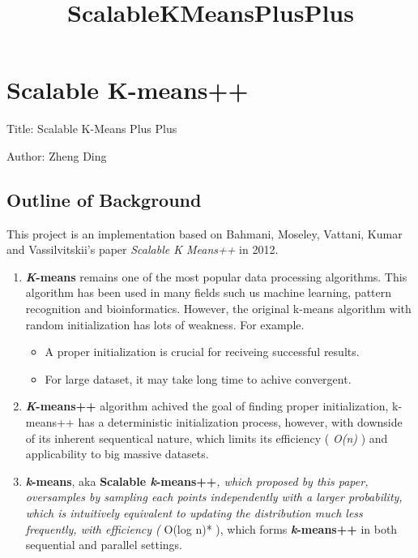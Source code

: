 \documentclass{article}
\title{ScalableKMeansPlusPlus}
\begin{document}
    
    
    \maketitle
    
    

    
    \section{Scalable K-means++}\label{scalable-k-means}

    Title: Scalable K-Means Plus Plus

Author: Zheng Ding

    \subsection{Outline of Background}\label{outline-of-background}

    This project is an implementation based on Bahmani, Moseley, Vattani,
Kumar and Vassilvitskii's paper \emph{Scalable K Means++} in 2012.

\begin{enumerate}
\def\labelenumi{\arabic{enumi}.}
\item
  \textbf{\emph{K}-means} remains one of the most popular data
  processing algorithms. This algorithm has been used in many fields
  such us machine learning, pattern recognition and bioinformatics.
  However, the original k-means algorithm with random initialization has
  lots of weakness. For example.

  \begin{itemize}
  \itemsep1pt\parskip0pt
  \item
    A proper initialization is crucial for reciveing successful results.
  \item
    For large dataset, it may take long time to achive convergent.
  \end{itemize}
\item
  \textbf{\emph{K}-means++} algorithm achived the goal of finding proper
  initialization, k-means++ has a deterministic initialization process,
  however, with downside of its inherent sequentical nature, which
  limits its efficiency ( \emph{O(n)} ) and applicability to big massive
  datasets.
\item
  \textbf{\emph{k}-means\textbar{}\textbar{}}, aka \textbf{Scalable
  \emph{k}-means++}\emph{, which proposed by this paper, oversamples by
  sampling each points independently with a larger probability, which is
  intuitively equivalent to updating the distribution much less
  frequently, with efficiency ( }O(log n)* ), which forms
  \textbf{\emph{k}-means++} in both sequential and parallel settings.
\end{enumerate}
\end{document}
